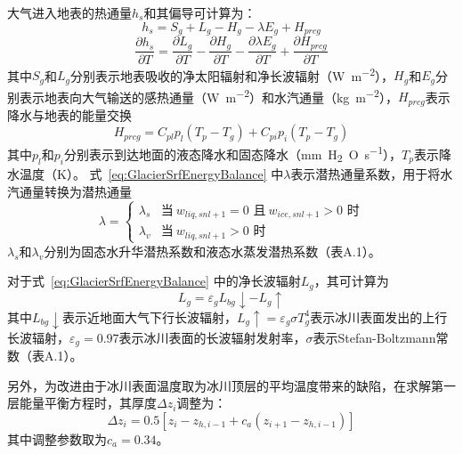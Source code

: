 大气进入地表的热通量$h_s$和其偏导可计算为：
\begin{equation}\label{eq:GlacierSrfEnergyBalance}
    h_s = S_g + L_g - H_g - \lambda E_g + H_{prcg}
\end{equation}
\begin{equation}
    \frac{\partial h_s}{\partial T} = \frac{\partial L_g}{\partial T} -\frac{\partial H_g}{\partial T} -\frac{\partial \lambda E_g}{\partial T} +\frac{\partial H_{prcg}}{\partial T}
\end{equation}
其中$S_g$和$L_g$分别表示地表吸收的净太阳辐射和净长波辐射（\unit{W.m^{-2}}），$H_g$和$E_g$分别表示地表向大气输送的感热通量（\unit{W.m^{-2}}）和水汽通量（\unit{kg.m^{-2}}），$H_{prcg}$表示降水与地表的能量交换
\begin{equation}
    H_{prcg} = C_{pl}p_l\left(T_p-T_g\right) + C_{pi}p_i\left(T_p-T_g\right)
\end{equation}
其中$p_l$和$p_i$分别表示到达地面的液态降水和固态降水（\unit{mm.H_2O.s^{-1}}），$T_p$表示降水温度（K）。
式~\eqref{eq:GlacierSrfEnergyBalance} 中$\lambda$表示潜热通量系数，用于将水汽通量转换为潜热通量
\begin{equation}
    \lambda = \begin{cases}
        \lambda_s &\text{当}\ w_{liq,snl+1}=0\text{ 且}\ w_{ice,snl+1}>0\text{ 时}\\
        \lambda_v &\text{当}\ w_{liq,snl+1}>0\text{ 时}
    \end{cases}
\end{equation}
$\lambda_s$和$\lambda_v$分别为固态水升华潜热系数和液态水蒸发潜热系数（表A.1）。

对于式~\eqref{eq:GlacierSrfEnergyBalance} 中的净长波辐射$L_g$，其可计算为
\begin{equation}
    L_g = \varepsilon_g L_{bg}\downarrow - L_g\uparrow
\end{equation}
其中$L_{bg}\downarrow$表示近地面大气下行长波辐射，$L_g\uparrow=\varepsilon_g\sigma T^4_g$表示冰川表面发出的上行长波辐射，$\varepsilon_g=0.97$表示冰川表面的长波辐射发射率，$\sigma$表示Stefan-Boltzmann常数（表A.1）。

另外，为改进由于冰川表面温度取为冰川顶层的平均温度带来的缺陷，在求解第一层能量平衡方程时，其厚度$\Delta z_i$调整为：
\begin{equation}
    \Delta z_i = 0.5\left[z_i-z_{h,i-1}+c_a\left(z_{i+1}-z_{h,i-1}\right)\right]
\end{equation}
其中调整参数取为$c_a=0.34$。

